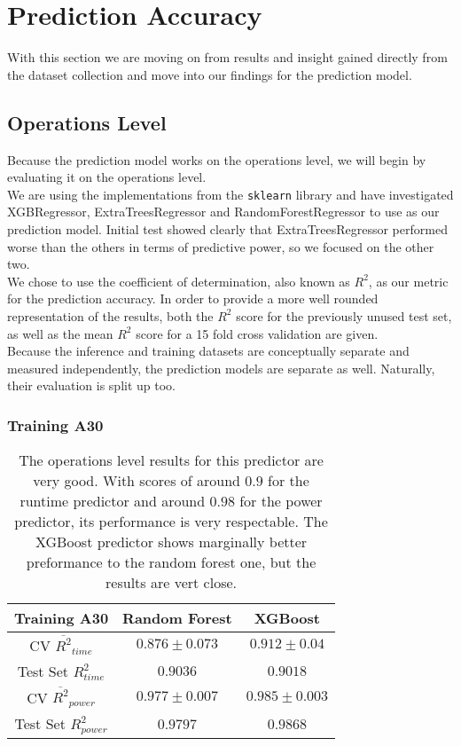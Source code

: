 \section{Prediction Accuracy}

With this section we are moving on from results and insight gained directly from the dataset collection and move into our findings for the prediction model.

\subsection{Operations Level}

Because the prediction model works on the operations level, we will begin by evaluating it on the operations level. \\
We are using the implementations from the \texttt{sklearn} library and have investigated XGBRegressor, ExtraTreesRegressor and RandomForestRegressor to use as our prediction model. Initial test showed clearly that ExtraTreesRegressor performed worse than the others in terms of predictive power, so we focused on the other two. \\
We chose to use the coefficient of determination, also known as $R^2$, as our metric for the prediction accuracy. In order to provide a more well rounded representation of the results, both the $R^2$ score for the previously unused test set, as well as the mean $R^2$ score for a 15 fold cross validation are given. \\
Because the inference and training datasets are conceptually separate and measured independently, the prediction models are separate as well. Naturally,  their evaluation is split up too.


\subsubsection{Training A30}



\begin{table}[h!]
\centering
\begin{tabular}{|c|c|c|}
\hline
 \textbf{Training A30}& \textbf{Random Forest} & \textbf{XGBoost} \\
\hline
CV $\overline{R^2}_{time}$ & $0.876 \pm 0.073$ &  $0.912 \pm 0.04$ \\
\hline
Test Set $R^2_{time}$ & $0.9036$ & $0.9018$ \\
\hline
CV $\overline{R^2}_{power}$ & $0.977 \pm 0.007$  &  $0.985 \pm 0.003$\\
\hline
Test Set $R^2_{power}$ & $0.9797$ & $0.9868$ \\
\hline
\end{tabular}
\caption{The operations level results for this predictor are very good. With scores of around $0.9$ for the runtime predictor and around $0.98$ for the power predictor, its performance is very respectable. The XGBoost predictor shows marginally better preformance to the random forest one, but the results are vert close.}
\label{tab:pred_res}
\end{table}



